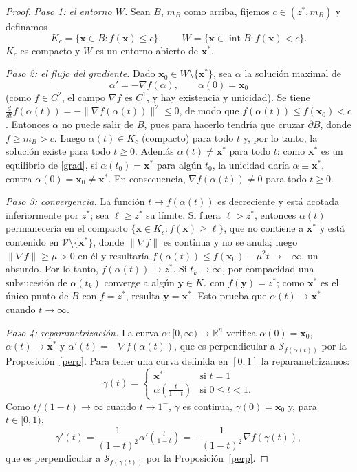 \documentclass[12pt, a4paper]{amsbook}
\newcommand{\R}{{\mathbb R}}
\newcommand{\Vc}{{\mathcal V}}
\newcommand{\Sw}{{\mathcal S}}
\newcommand{\xx}{{\mathbf x}}
\newcommand{\yy}{{\mathbf y}}
\theoremstyle{remark}
\theoremstyle{definition}
\numberwithin{section}{chapter}
\numberwithin{subsection}{section}
\numberwithin{equation}{section}
\numberwithin{figure}{chapter}
\begin{document}
\begin{proof}
{\em Paso 1: el entorno $W$.} Sean $B$, $m_B$ como arriba, fijemos $c\in(z^*,m_B)$ y definamos
$$
K_c=\{\xx\in B\colon f(\xx)\le c\},\qquad W=\{\xx\in \operatorname{int}B\colon f(\xx)<c\}.
$$
$K_c$ es compacto y $W$ es un entorno abierto de $\xx^*$.

{\em Paso 2: el flujo del gradiente.} Dado $\xx_0\in W\setminus\{\xx^*\}$, sea $\alpha$ la solución maximal de
\begin{equation}\label{grad}
\alpha' = -\nabla f(\alpha),\qquad \alpha(0)=\xx_0
\end{equation}
(como $f\in C^2$, el campo $\nabla f$ es $C^1$, y hay existencia y unicidad). Se tiene $\frac{d}{dt}f(\alpha(t))=-\|\nabla f(\alpha(t))\|^2\le0$, de modo que $f(\alpha(t))\le f(\xx_0)<c$. Entonces $\alpha$ no puede salir de $B$, pues para hacerlo tendría que cruzar $\partial B$, donde $f\ge m_B>c$. Luego $\alpha(t)\in K_c$ (compacto) para todo $t$ y, por lo tanto, la solución existe para todo $t\ge0$. Además $\alpha(t)\neq\xx^*$ para todo $t$: como $\xx^*$ es un equilibrio de \eqref{grad}, si $\alpha(t_0)=\xx^*$ para algún $t_0$, la unicidad daría $\alpha\equiv\xx^*$, contra $\alpha(0)=\xx_0\ne\xx^*$. En consecuencia, $\nabla f(\alpha(t))\ne0$ para todo $t\ge0$.

{\em Paso 3: convergencia.} La función $t\mapsto f(\alpha(t))$ es decreciente y está acotada inferiormente por $z^*$; sea $\ell\ge z^*$ su límite. Si fuera $\ell>z^*$, entonces $\alpha(t)$ permanecería en el compacto $\{\xx\in K_c\colon f(\xx)\ge\ell\}$, que no contiene a $\xx^*$ y está contenido en $\Vc\setminus\{\xx^*\}$, donde $\|\nabla f\|$ es continua y no se anula; luego $\|\nabla f\|\ge\mu>0$ en él y resultaría $f(\alpha(t))\le f(\xx_0)-\mu^2t\to-\infty$, un absurdo. Por lo tanto, $f(\alpha(t))\to z^*$. Si $t_k\to\infty$, por compacidad una subsucesión de $\alpha(t_k)$ converge a algún $\yy\in K_c$ con $f(\yy)=z^*$; como $\xx^*$ es el único punto de $B$ con $f=z^*$, resulta $\yy=\xx^*$. Esto prueba que $\alpha(t)\to\xx^*$ cuando $t\to\infty$.

{\em Paso 4: reparametrización.} La curva $\alpha\colon[0,\infty)\to\R^n$ verifica $\alpha(0)=\xx_0$, $\alpha(t)\to\xx^*$ y $\alpha'(t)=-\nabla f(\alpha(t))$, que es perpendicular a $\Sw_{f(\alpha(t))}$ por la Proposición~\ref{perp}. Para tener una curva definida en $[0,1]$ la reparametrizamos:
$$
\gamma(t) = \begin{cases}
\xx^* & \text{si } t=1\\
\alpha\!\left(\tfrac{t}{1-t}\right) & \text{si } 0\le t< 1.
\end{cases}
$$
Como $t/(1-t)\to\infty$ cuando $t\to1^-$, $\gamma$ es continua, $\gamma(0) = \xx_0$ y, para $t\in[0,1)$,
$$
\gamma'(t) = \frac{1}{(1-t)^2}\alpha'\!\left(\tfrac{t}{1-t}\right) = -\frac{1}{(1-t)^2}\nabla f\!\left(\gamma(t)\right),
$$
que es perpendicular a $\Sw_{f(\gamma(t))}$ por la Proposición~\ref{perp}.
\end{proof}
\end{document}
